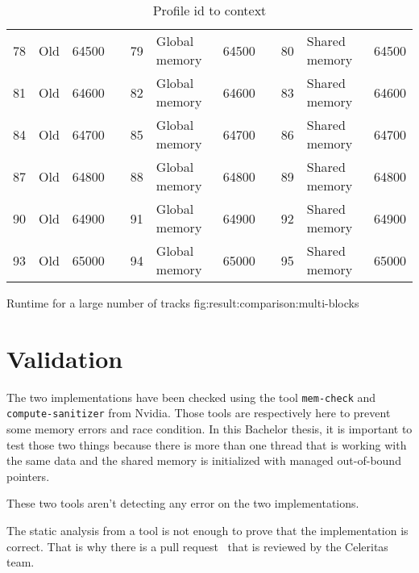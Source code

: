 \begin{table}[ht]
{\begin{tabular}{|l|l|l|l|l|l|l|l|l|l|l|}
        78  & Old            & 64500    & & 79  & Global memory & 64500   & & 80    & Shared memory & 64500 \\ \cline{1-3} \cline{5-7} \cline{9-11}
        81  & Old            & 64600    & & 82  & Global memory & 64600   & & 83    & Shared memory & 64600 \\ \cline{1-3} \cline{5-7} \cline{9-11}
        84  & Old            & 64700    & & 85  & Global memory & 64700   & & 86    & Shared memory & 64700 \\ \cline{1-3} \cline{5-7} \cline{9-11}
        87  & Old            & 64800    & & 88  & Global memory & 64800   & & 89    & Shared memory & 64800 \\ \cline{1-3} \cline{5-7} \cline{9-11}
        90  & Old            & 64900    & & 91  & Global memory & 64900   & & 92    & Shared memory & 64900 \\ \cline{1-3} \cline{5-7} \cline{9-11}
        93  & Old            & 65000    & & 94  & Global memory & 65000   & & 95    & Shared memory & 65000 \\ \cline{1-3} \cline{5-7} \cline{9-11}
    \end{tabular}
    }
    \caption{Profile id to context}
    \label{tab:result:comparison:profile}
\end{table}

{Runtime for a large number of tracks}
{fig:result:comparison:multi-blocks}

\section{Validation}
\label{ch:result:validation}

The two implementations have been checked using the tool \texttt{mem-check} and
\texttt{compute-sanitizer} from Nvidia.
Those tools are respectively here to prevent some memory errors and race
condition.
In this Bachelor thesis, it is important to test those two things because there
is more than one thread that is working with the same data and the shared memory
is initialized with managed out-of-bound pointers.

These two tools aren't detecting any error on the two implementations.

The static analysis from a tool is not enough to prove that the implementation is
correct.
That is why there is a pull request~\cite{pull-request-barras} that is reviewed
by the Celeritas team.